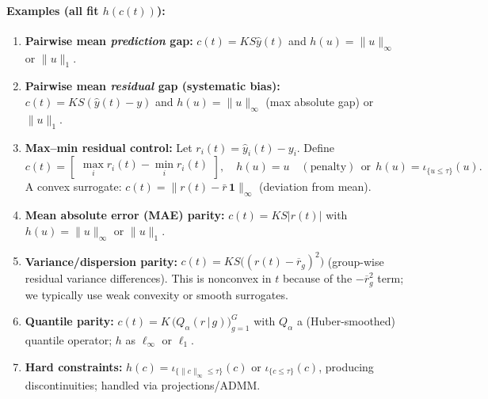 \documentclass[11pt]{article}
\theoremstyle{plain}
\theoremstyle{definition}
\newcommand{\1}{\mathbf{1}}
\newcommand{\indC}[1]{\iota_{#1}}
\begin{document}
\paragraph{Examples (all fit $h(c(t))$):}
\begin{enumerate}[leftmargin=2em,label=\textbf{E\arabic*.}]
 \item \textbf{Pairwise mean \emph{prediction} gap:}
 $c(t)=K S \hat y(t)$ and $h(u)=\|u\|_\infty$ or $\|u\|_1$.

 \item \textbf{Pairwise mean \emph{residual} gap (systematic bias):}
 $c(t)=K S(\hat y(t)-y)$ and $h(u)=\|u\|_\infty$ (max absolute gap) or $\|u\|_1$.

 \item \textbf{Max--min residual control:}
 Let $r_i(t)=\hat y_i(t)-y_i$. Define
 \[
 c(t)=\begin{bmatrix} \max_i r_i(t) - \min_i r_i(t) \end{bmatrix},
 \quad
 h(u)=u \quad(\text{penalty}) \ \ \text{or}\ \ h(u)=\indC{\{u\le \tau\}}(u).
 \]
 A convex surrogate: $c(t) = \big\| r(t)-\bar r \,\1 \big\|_{\infty}$ (deviation from mean).

 \item \textbf{Mean absolute error (MAE) parity:}
 $c(t)=K S|r(t)|$ with $h(u)=\|u\|_\infty$ or $\|u\|_1$.

 \item \textbf{Variance/dispersion parity:}
 $c(t)=K S\big((r(t)-\overline r_g)^2\big)$ (group-wise residual variance differences). This is nonconvex in $t$ because of the $-\overline r_g^2$ term; we typically use weak convexity or smooth surrogates.

 \item \textbf{Quantile parity:}
 $c(t)=K\,\big(Q_\alpha(r\,|\,g)\big)_{g=1}^G$ with $Q_\alpha$ a (Huber-smoothed) quantile operator; $h$ as $\ell_\infty$ or $\ell_1$.

 \item \textbf{Hard constraints:} $h(c)=\indC{\{\|c\|_\infty\le\tau\}}(c)$ or $\indC{\{c\le \tau\}}(c)$, producing discontinuities; handled via projections/ADMM.
\end{enumerate}
\end{document}
